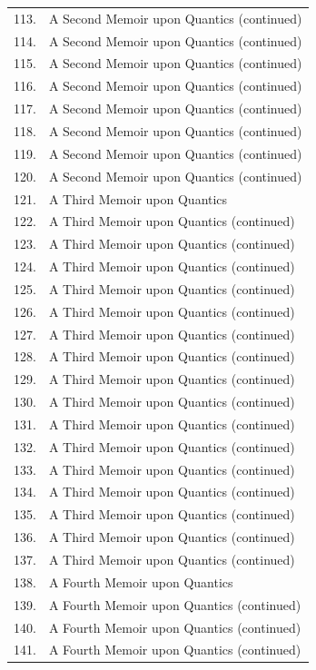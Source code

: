 \documentclass[11pt,a4paper]{book}
\begin{document}
\begin{center}
\begin{longtable}{rp{}}
113. & A Second Memoir upon Quantics (continued) \\
114. & A Second Memoir upon Quantics (continued) \\
115. & A Second Memoir upon Quantics (continued) \\
116. & A Second Memoir upon Quantics (continued) \\
117. & A Second Memoir upon Quantics (continued) \\
118. & A Second Memoir upon Quantics (continued) \\
119. & A Second Memoir upon Quantics (continued) \\
120. & A Second Memoir upon Quantics (continued) \\
121. & A Third Memoir upon Quantics \\
122. & A Third Memoir upon Quantics (continued) \\
123. & A Third Memoir upon Quantics (continued) \\
124. & A Third Memoir upon Quantics (continued) \\
125. & A Third Memoir upon Quantics (continued) \\
126. & A Third Memoir upon Quantics (continued) \\
127. & A Third Memoir upon Quantics (continued) \\
128. & A Third Memoir upon Quantics (continued) \\
129. & A Third Memoir upon Quantics (continued) \\
130. & A Third Memoir upon Quantics (continued) \\
131. & A Third Memoir upon Quantics (continued) \\
132. & A Third Memoir upon Quantics (continued) \\
133. & A Third Memoir upon Quantics (continued) \\
134. & A Third Memoir upon Quantics (continued) \\
135. & A Third Memoir upon Quantics (continued) \\
136. & A Third Memoir upon Quantics (continued) \\
137. & A Third Memoir upon Quantics (continued) \\
138. & A Fourth Memoir upon Quantics \\
139. & A Fourth Memoir upon Quantics (continued) \\
140. & A Fourth Memoir upon Quantics (continued) \\
141. & A Fourth Memoir upon Quantics (continued) \\

\end{longtable}
\end{center}
\end{document}

